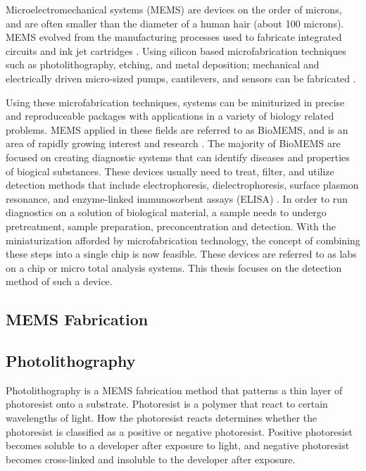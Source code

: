  \par Microelectromechanical systems (MEMS) are devices on the order of microns, and are often smaller than the diameter of a human hair (about 100 microns). MEMS evolved from the manufacturing processes used to fabricate integrated circuits and ink jet cartridges \cite{xia_soft_1998-1}. Using silicon based microfabrication techniques such as photolithography, etching, and metal deposition; mechanical and electrically driven micro-sized pumps, cantilevers, and sensors can be fabricated \cite{wang_bio-mems:_2006}. 
 
 \par Using these microfabrication techniques, systems can be miniturized in precise and reproduceable packages with applications in a variety of biology related problems. MEMS applied in these fields are referred to as BioMEMS, and is an area of rapidly growing interest and research \cite{grayson_biomems_2004}. The majority of BioMEMS are focused on creating diagnostic systems that can identify diseases and properties of biogical substances. These devices usually need to treat, filter, and utilize detection methods that include electrophoresis, dielectrophoresis, surface plasmon resonance, and enzyme-linked immunosorbent assays (ELISA) \cite{foudeh_microfluidic_2012}. In order to run diagnostics on a solution of biological material, a sample needs to undergo pretreatment, sample preparation, preconcentration and detection. With the miniaturization afforded by microfabrication technology, the concept of combining these steps into a single chip is now feasible. These devices are referred to as labs on a chip or micro total analysis systems. This thesis focuses on the detection method of such a device.
 
 \subsection{MEMS Fabrication}
 
 \subsection*{Photolithography}
 
 \par Photolithography is a MEMS fabrication method that patterns a thin layer of photoresist onto a substrate. Photoresist is a polymer that react to certain wavelengths of light. How the photoresist reacts determines whether the photoresist is classified as a positive or negative photoresist. Positive photoresist becomes soluble to a developer after exposure to light, and negative photoresist becomes cross-linked and insoluble to the developer after exposure. 
 
